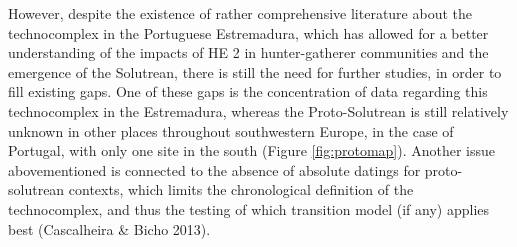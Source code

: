 \documentclass[12pt,twoside]{reedthesis}
\begin{document}
However, despite the existence of rather comprehensive literature about the technocomplex in the Portuguese Estremadura, which has allowed for a better understanding of the impacts of HE 2 in hunter-gatherer communities and the emergence of the Solutrean, there is still the need for further studies, in order to fill existing gaps. One of these gaps is the concentration of data regarding this technocomplex in the Estremadura, whereas the Proto-Solutrean is still relatively unknown in other places throughout southwestern Europe, in the case of Portugal, with only one site in the south (Figure \ref{fig:protomap}). Another issue abovementioned is connected to the absence of absolute datings for proto-solutrean contexts, which limits the chronological definition of the technocomplex, and thus the testing of which transition model (if any) applies best (Cascalheira \& Bicho 2013).
\end{document}
